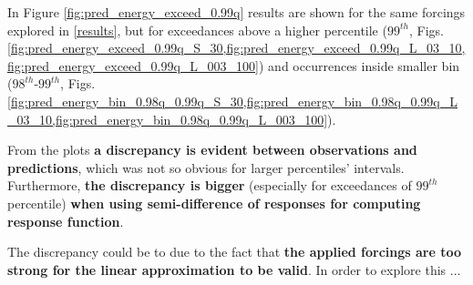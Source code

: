 \documentclass{article}
\begin{document}
In Figure \ref{fig:pred_energy_exceed_0.99q} results are shown for the same forcings explored in \ref{results}, but for exceedances above a higher percentile ($99^{th}$, Figs. \cref{fig:pred_energy_exceed_0.99q_S_30,fig:pred_energy_exceed_0.99q_L_03_10,fig:pred_energy_exceed_0.99q_L_003_100}) and occurrences inside smaller bin ($98^{th}$-$99^{th}$, Figs. \cref{fig:pred_energy_bin_0.98q_0.99q_S_30,fig:pred_energy_bin_0.98q_0.99q_L_03_10,fig:pred_energy_bin_0.98q_0.99q_L_003_100}). 

From the plots \textbf{a discrepancy is evident between observations and predictions}, which was not so obvious for larger percentiles' intervals. Furthermore, \textbf{the discrepancy is bigger} (especially for exceedances of $99^{th}$ percentile) \textbf{when using semi-difference of responses for computing response function}.

The discrepancy could be to due to the fact that \textbf{the applied forcings are too strong for the linear approximation to be valid}. In order to explore this ...   
\end{document}
